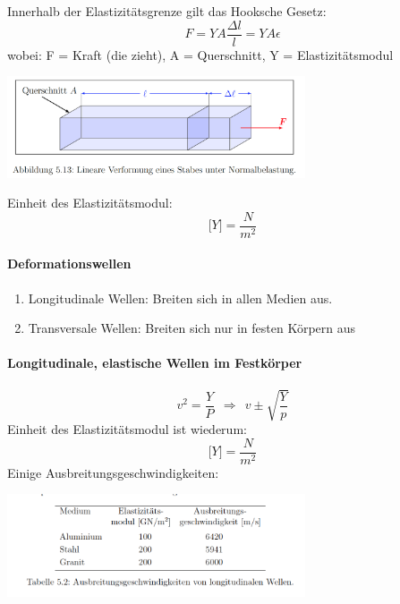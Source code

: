 \documentclass[7pt]{article}
\begin{document}
\begin{multicols*}{3}
Innerhalb der Elastizitätsgrenze gilt das Hooksche Gesetz:
\begin{equation*}
F = YA \frac{\Delta l}{l} = YA\epsilon
\end{equation*}
wobei: F = Kraft (die zieht), A = Querschnitt, Y = Elastizitätsmodul
\newline
\begin{center}
	\includegraphics[width=250pt]{images/elastizitaetsmodul.png}
\end{center}

Einheit des Elastizit{\"a}tsmodul:
\begin{equation*}
\lbrack Y \rbrack = \frac{N}{m^2}
\end{equation*}

\paragraph{Deformationswellen}
\begin{enumerate}
  \item Longitudinale Wellen: Breiten sich in allen Medien aus.
  \item Transversale Wellen: Breiten sich nur in festen K{\"o}rpern aus
\end{enumerate}

\paragraph{Longitudinale, elastische Wellen im Festk{\"orper}}
\begin{equation*}
v^2 = \frac{Y}{P} \>\> \Longrightarrow \>\> v \pm \sqrt{\frac{Y}{p}}
\end{equation*}
Einheit des Elastizit{\"a}tsmodul ist wiederum:
\begin{equation*}
\lbrack Y \rbrack = \frac{N}{m^2}
\end{equation*}
\newline
Einige Ausbreitungsgeschwindigkeiten:
\begin{center}
	\includegraphics[width=250pt]{images/wellenausbreitungsgeschwindigkeit_long}
\end{center}


\end{multicols*}
\end{document}
